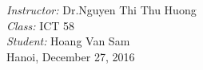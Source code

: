 \documentclass[12pt, a4paper]{article}
\begin{document}
\begin{titlepage}

\emph{Instructor:} Dr.Nguyen Thi Thu Huong \\
\emph{Class:} ICT 58\\
\emph{Student:} Hoang Van Sam \\[1.9cm]







{\large Hanoi, December 27, 2016}\\

 

\vfill %

\end{titlepage}

\tableofcontents
\clearpage
\end{document}
